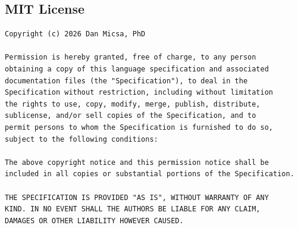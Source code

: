 \documentclass[10pt,onecolumn,letterpaper]{article}
\begin{document}
\begin{appendices}

\section*{MIT License}

\begin{lstlisting}
Copyright (c) 2026 Dan Micsa, PhD

Permission is hereby granted, free of charge, to any person
obtaining a copy of this language specification and associated
documentation files (the "Specification"), to deal in the
Specification without restriction, including without limitation
the rights to use, copy, modify, merge, publish, distribute,
sublicense, and/or sell copies of the Specification, and to
permit persons to whom the Specification is furnished to do so,
subject to the following conditions:

The above copyright notice and this permission notice shall be
included in all copies or substantial portions of the Specification.

THE SPECIFICATION IS PROVIDED "AS IS", WITHOUT WARRANTY OF ANY
KIND. IN NO EVENT SHALL THE AUTHORS BE LIABLE FOR ANY CLAIM,
DAMAGES OR OTHER LIABILITY HOWEVER CAUSED.
\end{lstlisting}

\end{appendices}
\end{document}
